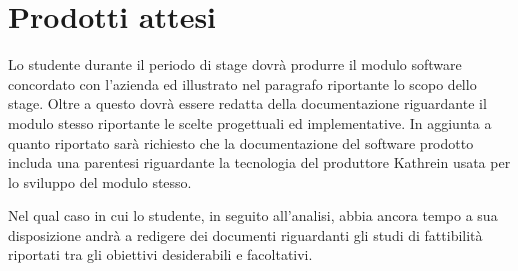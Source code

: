 \section*{Prodotti attesi}
Lo studente durante il periodo di stage dovrà produrre il modulo software concordato 
con l'azienda ed illustrato nel paragrafo riportante lo scopo dello stage. Oltre a questo dovrà essere
redatta della documentazione riguardante il modulo stesso riportante le scelte progettuali ed implementative.
In aggiunta a quanto riportato sarà richiesto che la documentazione del software prodotto includa una
parentesi riguardante la tecnologia del produttore Kathrein usata per lo sviluppo del modulo stesso.
    
    

Nel qual caso in cui lo studente, in seguito all'analisi, abbia ancora tempo a sua disposizione andrà a redigere
dei documenti riguardanti gli studi di fattibilità riportati tra gli obiettivi desiderabili e facoltativi.
